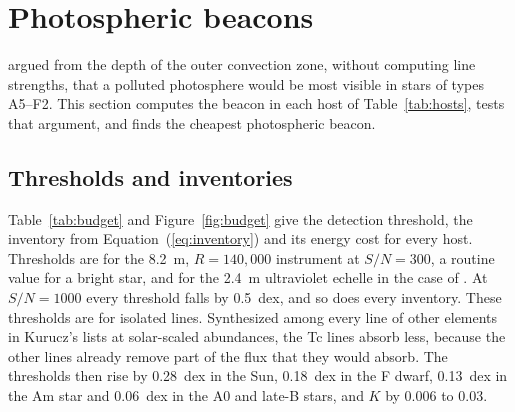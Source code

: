 \documentclass[final,5p]{elsarticle}
\begin{document}
\begin{table}
\centering
\caption{Host stars. $M_\mathrm{mix}$ is the mass of the layer that the pollutant mixes into, with its adopted range in brackets (Section~\ref{sec:dilution}). The late-B star mixes only its atmosphere above $\tau_{5000} = 3$ (Section~\ref{sec:levitation}), and we give no range.}
\label{tab:hosts}
\footnotesize
\setlength{\tabcolsep}{3pt}

\end{table}

\section{Photospheric beacons}
\label{sec:results}

\citet{Whitmire1980} argued from the depth of the outer convection zone, without computing line strengths, that a polluted photosphere would be most visible in stars of types A5--F2. This section computes the beacon in each host of Table~\ref{tab:hosts}, tests that argument, and finds the cheapest photospheric beacon.

\subsection{Thresholds and inventories}
\label{sec:inventories}

Table~\ref{tab:budget} and Figure~\ref{fig:budget} give the detection threshold, the inventory from Equation~(\ref{eq:inventory}) and its energy cost for every host. Thresholds are for the 8.2~m, $R = 140{,}000$ instrument at $S/N = 300$, a routine value for a bright star, and for the 2.4~m ultraviolet echelle in the case of . At $S/N = 1000$ every threshold falls by 0.5~dex, and so does every inventory. These thresholds are for isolated lines. Synthesized among every line of other elements in Kurucz's lists at solar-scaled abundances, the Tc lines absorb less, because the other lines already remove part of the flux that they would absorb. The thresholds then rise by 0.28~dex in the Sun, 0.18~dex in the F dwarf, 0.13~dex in the Am star and 0.06~dex in the A0 and late-B stars, and $K$ by 0.006 to 0.03.
\end{document}
